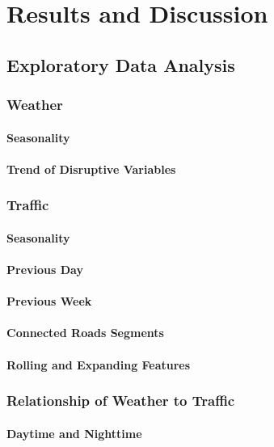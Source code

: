 \chapter{Results and Discussion}

\section{Exploratory Data Analysis}

\subsection{Weather}
\subsubsection{Seasonality}
\subsubsection{Trend of Disruptive Variables}


\subsection{Traffic}
\subsubsection{Seasonality}
\subsubsection{Previous Day}
\subsubsection{Previous Week}
\subsubsection{Connected Roads Segments}
\subsubsection{Rolling and Expanding Features}


\subsection{Relationship of Weather to Traffic}
\subsubsection{Daytime and Nighttime}
